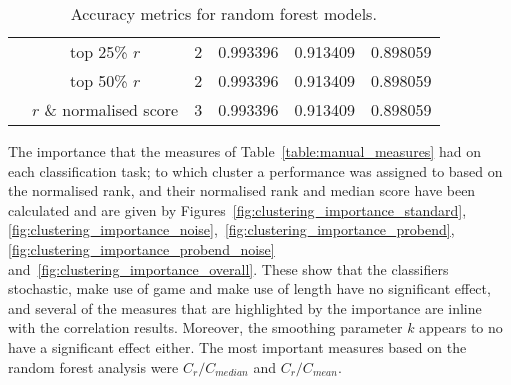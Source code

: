 \begin{table}[!htbp]
\begin{center}
{\begin{tabular}{lccccc}
                                             & top 25\% $r$              & 2 & 0.993396 & 0.913409 & 0.898059 \\
                                             & top 50\% $r$              & 2 & 0.993396 & 0.913409 & 0.898059 \\
                                             & $r$  \& normalised score  & 3 & 0.993396 & 0.913409 & 0.898059 \\
    \bottomrule
        \end{tabular}}
    \end{center}
    \caption{Accuracy metrics for random forest models.}
    \label{table:accuracy_random_forest}
\end{table}

The importance that the measures of Table~\ref{table:manual_measures} had on
each classification task; to which cluster a performance was assigned to based
on the normalised rank, and their normalised rank and median score have been
calculated and are given by Figures~\ref{fig:clustering_importance_standard},
\ref{fig:clustering_importance_noise},~\ref{fig:clustering_importance_probend},
\ref{fig:clustering_importance_probend_noise}
and~\ref{fig:clustering_importance_overall}. These show that the classifiers
stochastic, make use of game and make use of length have no significant effect,
and several of the measures that are highlighted by the importance are inline with
the correlation results. Moreover, the smoothing parameter \(k\) appears to no
have a significant effect either. The most important measures based on the
random forest analysis were $C_{r} / C_{median}$ and $C_r / C_{mean}$.

